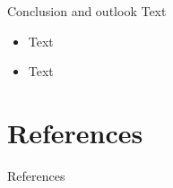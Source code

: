 \documentclass[
	9pt,
	xcolor={dvipsnames, table}
]{beamer}
\begin{document}
\begin{frame}{Conclusion and outlook}
	Text

	\begin{itemize}
		\item Text
		\item Text
	\end{itemize}
\end{frame}





\part{References}


\begin{frame}[allowframebreaks, t]{References}
	\renewcommand{\bibfont}{\footnotesize}

	
	
\end{frame}
\end{document}
